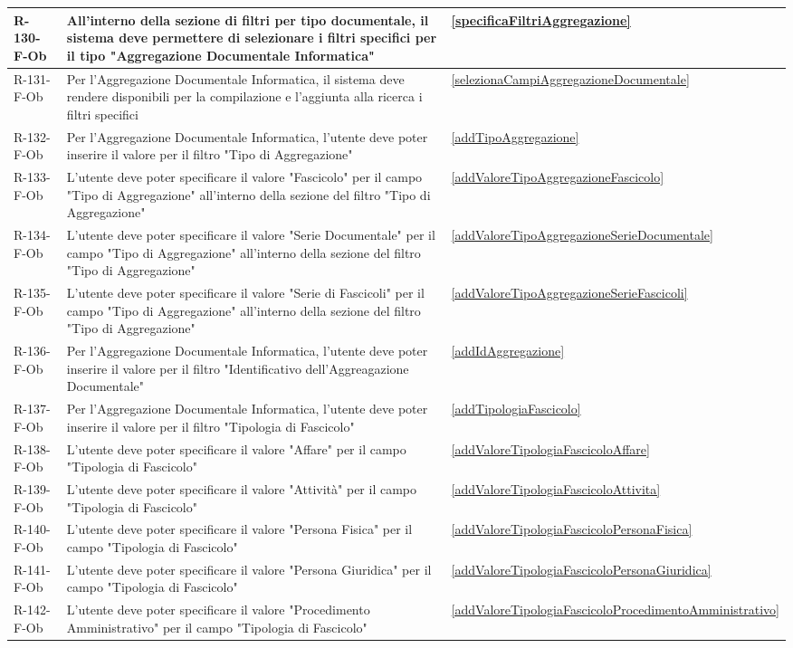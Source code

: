 \begin{longtable}{|p{2.5cm}|p{9.5cm}|p{2.5cm}|}
R-130-F-Ob & All'interno della sezione di filtri per tipo documentale, il sistema deve permettere di selezionare i filtri specifici per il tipo "Aggregazione Documentale Informatica" & \ref{specificaFiltriAggregazione} \\
\hline

R-131-F-Ob & Per l'Aggregazione Documentale Informatica, il sistema deve rendere disponibili per la compilazione e l'aggiunta alla ricerca i filtri specifici & \ref{selezionaCampiAggregazioneDocumentale} \\
\hline
R-132-F-Ob & Per l'Aggregazione Documentale Informatica, l'utente deve poter inserire il valore per il filtro "Tipo di Aggregazione" & \ref{addTipoAggregazione} \\
\hline
R-133-F-Ob & L'utente deve poter specificare il valore "Fascicolo" per il campo "Tipo di Aggregazione" all'interno della sezione del filtro "Tipo di Aggregazione" & \ref{addValoreTipoAggregazioneFascicolo} \\
\hline
R-134-F-Ob & L'utente deve poter specificare il valore "Serie Documentale" per il campo "Tipo di Aggregazione" all'interno della sezione del filtro "Tipo di Aggregazione" & \ref{addValoreTipoAggregazioneSerieDocumentale} \\
\hline
R-135-F-Ob & L'utente deve poter specificare il valore "Serie di Fascicoli" per il campo "Tipo di Aggregazione" all'interno della sezione del filtro "Tipo di Aggregazione" & \ref{addValoreTipoAggregazioneSerieFascicoli} \\
\hline

R-136-F-Ob & Per l'Aggregazione Documentale Informatica, l'utente deve poter inserire il valore per il filtro "Identificativo dell'Aggreagazione Documentale" & \ref{addIdAggregazione} \\
\hline
R-137-F-Ob & Per l'Aggregazione Documentale Informatica, l'utente deve poter inserire il valore per il filtro "Tipologia di Fascicolo" & \ref{addTipologiaFascicolo} \\
\hline
R-138-F-Ob & L'utente deve poter specificare il valore "Affare" per il campo "Tipologia di Fascicolo" & \ref{addValoreTipologiaFascicoloAffare} \\
\hline
R-139-F-Ob & L'utente deve poter specificare il valore "Attività" per il campo "Tipologia di Fascicolo" & \ref{addValoreTipologiaFascicoloAttivita} \\
\hline
R-140-F-Ob & L'utente deve poter specificare il valore "Persona Fisica" per il campo "Tipologia di Fascicolo" & \ref{addValoreTipologiaFascicoloPersonaFisica} \\
\hline
R-141-F-Ob & L'utente deve poter specificare il valore "Persona Giuridica" per il campo "Tipologia di Fascicolo" & \ref{addValoreTipologiaFascicoloPersonaGiuridica} \\
\hline
R-142-F-Ob & L'utente deve poter specificare il valore "Procedimento Amministrativo" per il campo "Tipologia di Fascicolo" & \ref{addValoreTipologiaFascicoloProcedimentoAmministrativo} \\


\end{longtable}
